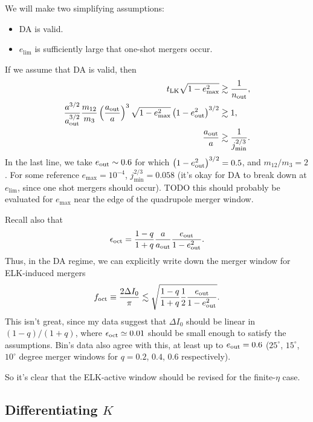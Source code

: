 \documentclass[11pt,
        usenames, %
        dvipsnames %
    ]{article}
\newcommand*{\p}[1]{\left(#1\right)}
\begin{document}
We will make two simplifying assumptions:
\begin{itemize}
    \item DA is valid.
    \item $e_{\lim}$ is sufficiently large that one-shot mergers occur.
\end{itemize}
If we assume that DA is valid, then
\begin{align}
    t_{\rm LK}\sqrt{1 - e_{\max}^2} &\gtrsim \frac{1}{n_{\rm out}},\\
    \frac{a^{3/2}}{a_{\rm out}^{3/2}}\frac{m_{12}}{m_3}
        \p{\frac{a_{\rm out}}{a}}^{3}\sqrt{1 - e_{\max}^2}
            \p{1 - e_{\rm out}^2}^{3/2} &\gtrsim 1,\\
    \frac{a_{\rm out}}{a} &\gtrsim \frac{1}{j_{\min}^{2/3}}.
\end{align}
In the last line, we take $e_{\rm out} \sim 0.6$ for which $\p{1 - e_{\rm
out}^2}^{3/2} = 0.5$, and $m_{12} / m_3 = 2$. For some reference $e_{\max} =
10^{-4}$, $j_{\min}^{2/3} = 0.058$ (it's okay for DA to break down at
$e_{\lim}$, since one shot mergers should occur). TODO this should probably be
evaluated for $e_{\max}$ near the edge of the quadrupole merger window.

Recall also that
\begin{equation}
    \epsilon_{\rm oct} = \frac{1 - q}{1 + q}\frac{a}{a_{\rm out}}
        \frac{e_{\rm out}}{1 - e_{\rm out}^2}.
\end{equation}
Thus, in the DA regime, we can explicitly write down the merger window for
ELK-induced mergers
\begin{equation}
    f_{\rm oct} \equiv \frac{2\Delta I_0}{\pi}
        \lesssim \sqrt{\frac{1 - q}{1 + q}\frac{1}{2}\frac{e_{\rm out}}{1 -
            e_{\rm out}^2}}.
\end{equation}
This isn't great, since my data suggest that $\Delta I_0$ should be linear in
$(1-q)/(1+q)$, where $\epsilon_{\rm oct} \simeq 0.01$ should be small enough to
satisfy the assumptions. Bin's data also agree with this, at least up to $e_{\rm
out} = 0.6$ ($25^\circ$, $15^\circ$, $10^\circ$ degree merger windows for $q =
0.2$, $0.4$, $0.6$ respectively).

So it's clear that the ELK-active window should be revised for the finite-$\eta$
case.

\subsection{Differentiating $K$}
\end{document}
